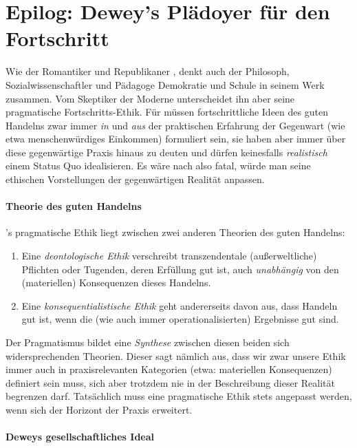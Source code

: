 \section[Epilog: Dewey]{Epilog: Dewey's Plädoyer für den Fortschritt}

Wie der Romantiker und Republikaner \citeauthor{rousseau-1762}, denkt auch der Philosoph, Sozialwissenschaftler und Pädagoge \citeauthor{Dewey2010} Demokratie und Schule in seinem Werk zusammen.
Vom Skeptiker der Moderne \citeauthor{Rousseau-1762-b} unterscheidet ihn aber seine pragmatische Fortschritts-Ethik.
Für \citeauthor{Dewey2010} müssen fortschrittliche Ideen des guten Handelns zwar immer \emph{in} und \emph{aus} der praktischen Erfahrung der Gegenwart (wie etwa menschenwürdiges Einkommen) formuliert sein, sie haben aber immer über diese gegenwärtige Praxis hinaus zu deuten und dürfen keinesfalls \emph{realistisch} einem Status Quo idealisieren.
Es wäre nach \citeauthor{Dewey2010} also fatal, würde man seine ethischen Vorstellungen der gegenwärtigen Realität anpassen.


\paragraph{Theorie des guten Handelns}

\citeauthor{Dewey1932}'s pragmatische Ethik liegt zwischen zwei anderen Theorien des guten Handelns:

\begin{enumerate}
	\item Eine \emph{deontologische Ethik} verschreibt transzendentale (außerweltliche) Pflichten oder Tugenden, deren Erfüllung gut ist, auch \emph{unabhängig} von den (materiellen) Konsequenzen dieses Handelns.
	\item Eine \emph{konsequentialistische Ethik} geht andererseits davon aus, dass Handeln gut ist, wenn die (wie auch immer operationalisierten) Ergebnisse gut sind.
\end{enumerate}

Der Pragmatismus bildet eine \emph{Synthese} zwischen diesen beiden sich widersprechenden Theorien.
Dieser sagt nämlich aus, dass wir zwar unsere Ethik immer auch in praxisrelevanten Kategorien (etwa: materiellen Konsequenzen) definiert sein muss, sich aber trotzdem nie in der Beschreibung dieser Realität begrenzen darf.
Tatsächlich muss eine pragmatische Ethik stets angepasst werden, wenn sich der Horizont der Praxis erweitert.


\paragraph{Deweys gesellschaftliches Ideal}

